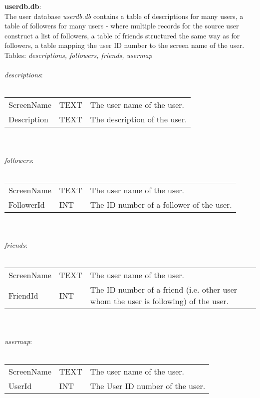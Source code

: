 \documentclass[paper=a4, fontsize=11pt]{scrartcl}
\numberwithin{equation}{section}		%
\numberwithin{figure}{section}			%
\numberwithin{table}{section}				%
\begin{document}
{\bf userdb.db}:\\

The user database \emph{userdb.db} contains a table of descriptions for many users, a table of followers for many users - where multiple records for the source user construct a list of followers, a table of friends structured the same way as for followers, a table mapping the user ID number to the screen name of the user.\\

Tables: \emph{descriptions, followers, friends, usermap}\\
\\
\emph{descriptions}:\\
\\
\begin{tabular}{l | l | p{13cm}} 
ScreenName & TEXT & The user name of the user.\\
Description & TEXT & The description of the user.\\
\end{tabular}\\
\\
\emph{followers}:\\
\\
\begin{tabular}{l | l | p{13cm}} 
ScreenName & TEXT & The user name of the user.\\
FollowerId & INT & The ID number of a follower of the user.\\
\end{tabular}\\
\\
\emph{friends}:\\
\\
\begin{tabular}{l | l | p{13cm}} 
ScreenName & TEXT & The user name of the user.\\
FriendId & INT & The ID number of a friend (i.e. other user whom the user is following) of the user.\\
\end{tabular}\\
\\
\emph{usermap}:\\
\\
\begin{tabular}{l | l | p{13cm}} 
ScreenName & TEXT & The user name of the user.\\
UserId & INT & The User ID number of the user.\\
\end{tabular}\\
\\
\end{document}
